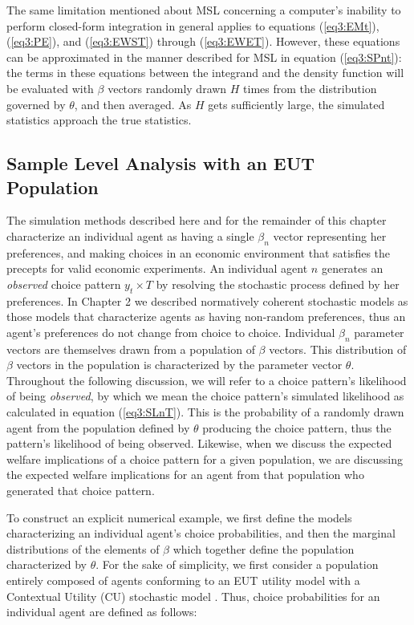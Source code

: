 \documentclass[../main.tex]{subfiles}
\begin{document}
The same limitation mentioned about MSL concerning a computer's inability to perform closed-form integration in general applies to equations (\ref{eq3:EMt}), (\ref{eq3:PE}), and (\ref{eq3:EWST}) through (\ref{eq3:EWET}).
However, these equations can be approximated in the manner described for MSL in equation (\ref{eq3:SPnt}): the terms in these equations between the integrand and the density function will be evaluated with $\beta$ vectors randomly drawn $H$ times from the distribution governed by $\theta$, and then averaged.
As $H$ gets sufficiently large, the simulated statistics approach the true statistics.

\subsection{Sample Level Analysis with an EUT Population}

The simulation methods described here and for the remainder of this chapter characterize an individual agent as having a single $\beta_n$ vector representing her preferences, and making choices in an economic environment that satisfies the \textcite{Smith1982} precepts for valid economic experiments.
An individual agent $n$ generates an \textit{observed} choice pattern $y_t \times T$ by resolving the stochastic process defined by her preferences.
In Chapter 2 we described normatively coherent stochastic models as those models that characterize agents as having non-random preferences, thus an agent's preferences do not change from choice to choice.{\footnotemark}
Individual $\beta_n$ parameter vectors are themselves drawn from a population of $\beta$ vectors.
This distribution of $\beta$ vectors in the population is characterized by the parameter vector $\theta$.
Throughout the following discussion, we will refer to a choice pattern's likelihood of being \textit{observed}, by which we mean the choice pattern's simulated likelihood as calculated in equation (\ref{eq3:SLnT}).
This is the probability of a randomly drawn agent from the population defined by $\theta$ producing the choice pattern, thus the pattern's likelihood of being observed.
Likewise, when we discuss the expected welfare implications of a choice pattern for a given population, we are discussing the expected welfare implications for an agent from that population who generated that choice pattern.

To construct an explicit numerical example, we first define the models characterizing an individual agent's choice probabilities, and then the marginal distributions of the elements of $\beta$ which together define the population characterized by $\theta$.
For the sake of simplicity, we first consider a population entirely composed of agents conforming to an EUT utility model with a Contextual Utility (CU) stochastic model \parencite{Wilcox2008}.
Thus, choice probabilities for an individual agent are defined as follows:
\end{document}
